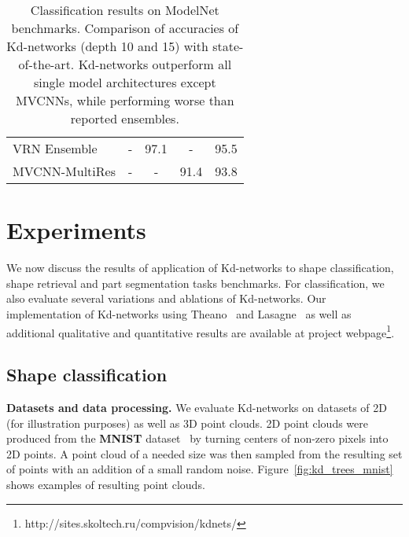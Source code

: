 \documentclass[10pt,twocolumn,letterpaper]{article}
\newcommand{\fig}[1]{Figure~\ref{fig:#1}}
\begin{document}
\begin{table}
\begin{center}
{\begin{tabular}{|l|c|c|c|c|}
\hline
{\small VRN Ensemble \cite{Brock16}} & {\small -}    & {\small 97.1} &                                                    {\small -}    & {\small 95.5}\\
{\small MVCNN-MultiRes \cite{Qi16a}} & {\small -}    & {\small -}    &                                                    {\small 91.4} & {\small 93.8}\\
\hline
\end{tabular}}   \end{center}
  \caption{Classification results on ModelNet benchmarks. Comparison of accuracies of Kd-networks (depth 10 and 15) with state-of-the-art. Kd-networks outperform all single model architectures except MVCNNs, while performing worse than reported ensembles.}
  \label{tab:class_ext}
\end{table}

\section{Experiments}
\label{sect:experiments}

We now discuss the results of application of Kd-networks to shape classification, shape retrieval and part segmentation tasks benchmarks. For classification, we also evaluate several variations and ablations of Kd-networks. Our implementation of Kd-networks using Theano~\cite{Theano16} and Lasagne~\cite{Dieleman15} as well as additional qualitative and quantitative results are available at project webpage\footnote{http://sites.skoltech.ru/compvision/kdnets/}.

\subsection{Shape classification}

\textbf{Datasets and data processing.} We evaluate Kd-networks on datasets of 2D (for illustration purposes) as well as 3D point clouds. 2D point clouds were produced from the \textbf{MNIST} dataset~\cite{LeCun98} by turning centers of non-zero pixels into 2D points. A point cloud of a needed size was then sampled from the resulting set of points with an addition of a small random noise. \fig{kd_trees_mnist} shows examples of resulting point clouds.
\end{document}
